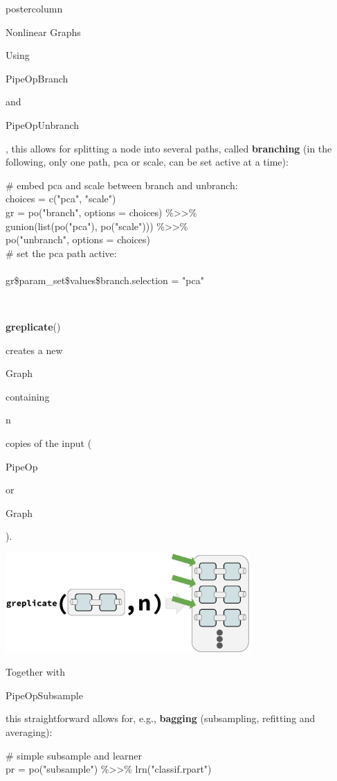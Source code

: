 \documentclass{beamer}
\newcommand{\codeinline}[1]{\begin{codeboxinline}#1\end{codeboxinline}}
\begin{document}
\begin{frame}[fragile]{}
\begin{columns}
\begin{column}{.245\textwidth}
\begin{beamercolorbox}[center]{postercolumn}
\begin{minipage}{.98\textwidth}
{\begin{myblock}{Nonlinear Graphs}
\begin{center}
              \end{center}
              Using \codeinline{PipeOpBranch} and \codeinline{PipeOpUnbranch}, this allows for splitting a node into several paths, called \textbf{branching} (in the following, only one path, pca or scale, can be set active at a time):
              \begin{codeboxexample}
						    {\footnotesize
                  \# embed pca and scale between branch and unbranch:\\
                  choices = c("pca", "scale")\\
                  gr = po("branch", options = choices) \%>{}>\%\\
                  \hspace*{1ex} gunion(list(po("pca"), po("scale"))) \%>{}>\%\\
                  \hspace*{1ex} po("unbranch", options = choices)\\
                  \# set the pca path active:\\
                  \ \\
                  gr\$param\_set\$values\$branch.selection = "pca"}
					      \end{codeboxexample}
              \ \\
              \codeinline{\textbf{greplicate}()} creates a new \codeinline{Graph} containing \codeinline{n} copies of the input (\codeinline{PipeOp} or \codeinline{Graph}).
              \begin{center}
                \includegraphics[width=0.7\textwidth]{img/greplicate.pdf}
              \end{center}
              Together with \codeinline{PipeOpSubsample} this straightforward allows for, e.g., \textbf{bagging} (subsampling, refitting and averaging):
              \begin{codeboxexample}
						    {\footnotesize
                  \# simple subsample and learner\\
                  pr = po("subsample") \%>{}>\% lrn("classif.rpart")\\
}
\end{codeboxexample}
\end{myblock}}
\end{minipage}
\end{beamercolorbox}
\end{column}
\end{columns}
\end{frame}
\end{document}
